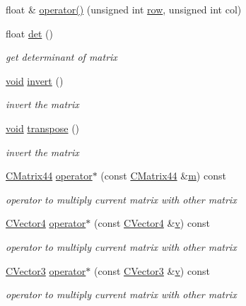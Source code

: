 \begin{DoxyCompactItemize}
float \& \hyperlink{class_c_matrix44_a9c7447aea10dbe50b5d08fc14ee855ea}{operator()} (unsigned int \hyperlink{glext_8h_a11b277b422822f784ee248b43eee3e1e}{row}, unsigned int col)
\item 
float \hyperlink{class_c_matrix44_a8b7503251ee013f9b124bc9c7368e6c0}{det} ()
\begin{DoxyCompactList}\small\item\em get determinant of matrix \end{DoxyCompactList}\item 
\hyperlink{glu_8h_a4292190e3f1f6b373a760c7d9316ad3c}{void} \hyperlink{class_c_matrix44_abeff331b137cedd256d6758b1cb11c4f}{invert} ()
\begin{DoxyCompactList}\small\item\em invert the matrix \end{DoxyCompactList}\item 
\hyperlink{glu_8h_a4292190e3f1f6b373a760c7d9316ad3c}{void} \hyperlink{class_c_matrix44_adfef3f6ae63043cd713e379bc7a1cfdd}{transpose} ()
\begin{DoxyCompactList}\small\item\em invert the matrix \end{DoxyCompactList}\item 
\hyperlink{class_c_matrix44}{C\-Matrix44} \hyperlink{class_c_matrix44_a4ded0d0824852b2aff8af3a3132a31d2}{operator$\ast$} (const \hyperlink{class_c_matrix44}{C\-Matrix44} \&\hyperlink{glext_8h_af593500c283bf1a787a6f947f503a5c2}{m}) const 
\begin{DoxyCompactList}\small\item\em operator to multiply current matrix with other matrix \end{DoxyCompactList}\item 
\hyperlink{class_c_vector4}{C\-Vector4} \hyperlink{class_c_matrix44_a41c31a6bbcc11ba8d3e915eb889577bc}{operator$\ast$} (const \hyperlink{class_c_vector4}{C\-Vector4} \&\hyperlink{gl_8h_a4568fc090febc136eed4577a600739ca}{v}) const 
\begin{DoxyCompactList}\small\item\em operator to multiply current matrix with other matrix \end{DoxyCompactList}\item 
\hyperlink{class_c_vector3}{C\-Vector3} \hyperlink{class_c_matrix44_ad792d8110c173872084afd817c2f7045}{operator$\ast$} (const \hyperlink{class_c_vector3}{C\-Vector3} \&\hyperlink{gl_8h_a4568fc090febc136eed4577a600739ca}{v}) const 
\begin{DoxyCompactList}\small\item\em operator to multiply current matrix with other matrix \end{DoxyCompactList}\item 

\end{DoxyCompactItemize}

